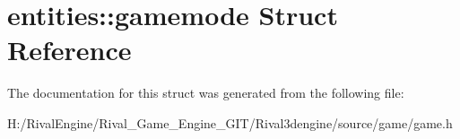 \hypertarget{structentities_1_1gamemode}{}\section{entities\+:\+:gamemode Struct Reference}
\label{structentities_1_1gamemode}


The documentation for this struct was generated from the following file\+:\begin{DoxyCompactItemize}
\item 
H\+:/\+Rival\+Engine/\+Rival\+\_\+\+Game\+\_\+\+Engine\+\_\+\+G\+I\+T/\+Rival3dengine/source/game/game.\+h\end{DoxyCompactItemize}

